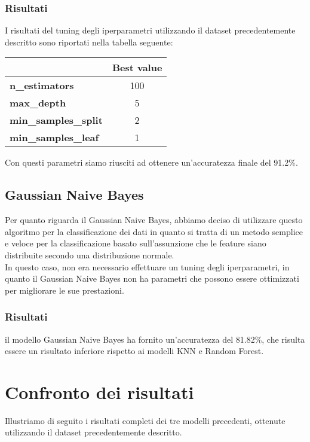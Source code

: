\documentclass[../../Report.tex]{subfiles}
\begin{document}
\subsubsection{Risultati}
I risultati del tuning degli iperparametri utilizzando il dataset precedentemente descritto sono riportati nella tabella seguente:

\begin{table}[H]
    \centering
    \begin{tabular}{|l|c|}
        \hline
        & \textbf{Best value} \\
        \hline
        \textbf{n\_estimators} & 100 \\
        \hline
        \textbf{max\_depth} & 5 \\
        \hline
        \textbf{min\_samples\_split} & 2 \\
        \hline
        \textbf{min\_samples\_leaf} & 1 \\
        \hline
    \end{tabular}
\end{table}

Con questi parametri siamo riusciti ad ottenere un'accuratezza finale del 91.2\%.

\subsection{Gaussian Naive Bayes}
Per quanto riguarda il Gaussian Naive Bayes, abbiamo deciso di utilizzare questo algoritmo per la classificazione dei dati in quanto si tratta di un metodo semplice e veloce per la classificazione basato sull'assunzione che le feature siano distribuite secondo una distribuzione normale.\\
In questo caso, non era necessario effettuare un tuning degli iperparametri, in quanto il Gaussian Naive Bayes non ha parametri che possono essere ottimizzati per migliorare le sue prestazioni.

\subsubsection{Risultati}
il modello Gaussian Naive Bayes ha fornito un'accuratezza del 81.82\%, che risulta essere un risultato inferiore rispetto ai modelli KNN e Random Forest.

\section{Confronto dei risultati}
Illustriamo di seguito i risultati completi dei tre modelli precedenti, ottenute utilizzando il dataset precedentemente descritto.
\end{document}
